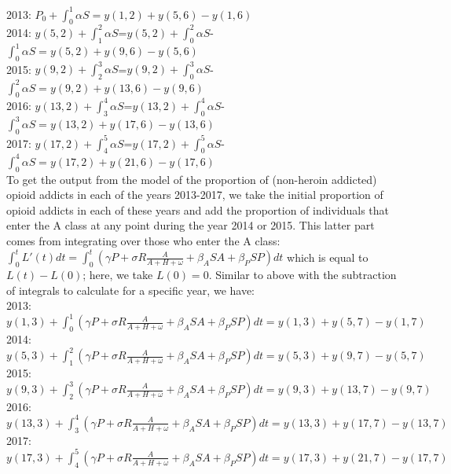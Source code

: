 \documentclass[12pt]{article}
\begin{document}
2013: $P_0 + \int_0^1 \alpha S = y(1,2)+y(5,6)-y(1,6)$ \\
2014: $y(5,2)+\int_1^2 \alpha S$=$y(5,2)+\int_0^2 \alpha S$- $\int_0^1 \alpha S=y(5,2)+y(9,6)-y(5,6)$ \\
2015: $y(9,2)+\int_2^3 \alpha S$=$y(9,2)+\int_0^3 \alpha S$- $\int_0^2 \alpha S=y(9,2)+y(13,6)-y(9,6)$ \\
2016: $y(13,2)+\int_3^4 \alpha S$=$y(13,2)+\int_0^4 \alpha S$- $\int_0^3 \alpha S=y(13,2)+y(17,6)-y(13,6)$ \\
2017: $y(17,2)+\int_4^5 \alpha S$=$y(17,2)+\int_0^5\alpha S$- $\int_0^4 \alpha S=y(17,2)+y(21,6)-y(17,6)$ \\


 To get the output from the model of the proportion of (non-heroin addicted) opioid addicts in each of the years 2013-2017, we take the initial proportion of opioid addicts in each of these years and add the proportion of individuals that enter the A class at any point during the year 2014 or 2015. This latter part comes from integrating over those who enter the A class: $\int_0^t L'(t)dt=\int_0^t (\gamma P + \sigma R\frac{A}{A+H+\omega}+\beta_A SA+\beta_P SP) dt$ which is equal to $L(t)-L(0)$; here, we take $L(0)=0.$ Similar to above with the subtraction of integrals to calculate for a specific year, we have: \\
 2013: $y(1,3)+\int_0^1 (\gamma P + \sigma R\frac{A}{A+H+\omega}+\beta_A SA+\beta_P SP) dt= y(1,3)+y(5,7)-y(1,7)$ \\
 2014: $y(5,3)+\int_1^2 (\gamma P + \sigma R\frac{A}{A+H+\omega}+\beta_A SA+\beta_P SP) dt= y(5,3)+y(9,7)-y(5,7)$ \\
 2015: $y(9,3)+\int_2^3 (\gamma P + \sigma R\frac{A}{A+H+\omega}+\beta_A SA+\beta_P SP) dt= y(9,3)+y(13,7)-y(9,7)$ \\
  2016: $y(13,3)+\int_3^4 (\gamma P + \sigma R\frac{A}{A+H+\omega}+\beta_A SA+\beta_P SP) dt= y(13,3)+y(17,7)-y(13,7)$ \\
   2017: $y(17,3)+\int_4^5 (\gamma P + \sigma R\frac{A}{A+H+\omega}+\beta_A SA+\beta_P SP) dt= y(17,3)+y(21,7)-y(17,7)$ \\
\end{document}
